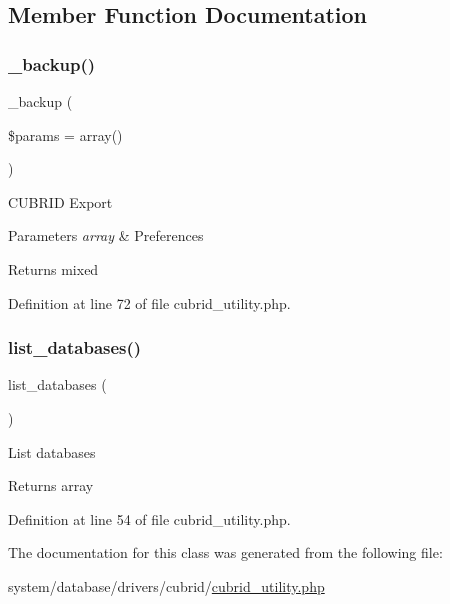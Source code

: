\subsection{Member Function Documentation}
\mbox{\label{class_c_i___d_b__cubrid__utility_a30f3053d2c82e7562349924363507afa}} 
\subsubsection{\texorpdfstring{\_backup()}{\_backup()}}
{\footnotesize\ttfamily \+\_\+backup (\begin{DoxyParamCaption}\item[{}]{\$params = {\ttfamily array()} }\end{DoxyParamCaption})\hspace{0.3cm}{\ttfamily [protected]}}

C\+U\+B\+R\+ID Export


\begin{DoxyParams}{Parameters}
{\em array} & Preferences \\
\hline
\end{DoxyParams}
\begin{DoxyReturn}{Returns}
mixed 
\end{DoxyReturn}


Definition at line 72 of file cubrid\+\_\+utility.\+php.

\mbox{\label{class_c_i___d_b__cubrid__utility_a8486b247a8868504b055622cb2dd34d3}} 
\subsubsection{\texorpdfstring{list\_databases()}{list\_databases()}}
{\footnotesize\ttfamily list\+\_\+databases (\begin{DoxyParamCaption}{ }\end{DoxyParamCaption})}

List databases

\begin{DoxyReturn}{Returns}
array 
\end{DoxyReturn}


Definition at line 54 of file cubrid\+\_\+utility.\+php.



The documentation for this class was generated from the following file\+:\begin{DoxyCompactItemize}
\item 
system/database/drivers/cubrid/\mbox{\hyperlink{cubrid__utility_8php}{cubrid\+\_\+utility.\+php}}\end{DoxyCompactItemize}
